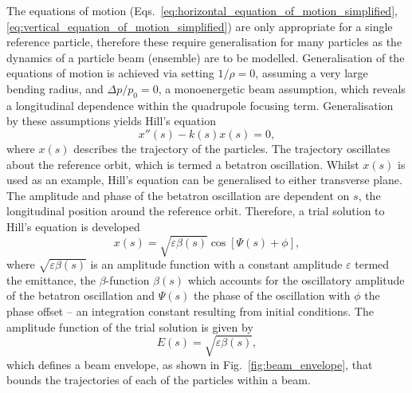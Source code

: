 \documentclass[../main.tex]{subfiles}
\begin{document}
The equations of motion (Eqs.~\ref{eq:horizontal_equation_of_motion_simplified}, \ref{eq:vertical_equation_of_motion_simplified}) are only appropriate for a single reference particle, therefore these require generalisation for many particles as the dynamics of a particle beam (ensemble) are to be modelled. Generalisation of the equations of motion is achieved via setting $1/\rho=0$, assuming a very large bending radius, and $\Delta p/p_{0}=0$, a monoenergetic beam assumption, which reveals a longitudinal dependence within the quadrupole focusing term. Generalisation by these assumptions yields Hill's equation
\begin{equation}
x''\left(s\right)-k\left(s\right)x\left(s\right) = 0,
\label{eq:Hills_equation}    
\end{equation}
where $x\left(s\right)$ describes the trajectory of the particles. The trajectory oscillates about the reference orbit, which is termed a betatron oscillation. Whilst $x\left(s\right)$ is used as an example, Hill's equation can be generalised to either transverse plane. The amplitude and phase of the betatron oscillation are dependent on $s$, the longitudinal position around the reference orbit. Therefore, a trial solution to Hill's equation is developed 
\begin{equation}
x\left(s\right) = \sqrt{\varepsilon\beta\left(s\right)}\cos\left[\Psi\left(s\right)+\phi\right],
\label{eq:Hills_trial_solution}    
\end{equation}
where $\sqrt{\varepsilon\beta\left(s\right)}$ is an amplitude function with a constant amplitude $\varepsilon$ termed the emittance, the $\beta$-function $\beta\left(s\right)$ which accounts for the oscillatory amplitude of the betatron oscillation and $\Psi\left(s\right)$ the phase of the oscillation with $\phi$ the phase offset -- an integration constant resulting from initial conditions. The amplitude function of the trial solution is given by
\begin{equation}
E\left(s\right) = \sqrt{\varepsilon\beta\left(s\right)},
\label{eq:envelope_function}    
\end{equation}
which defines a beam envelope, as shown in Fig.~\ref{fig:beam_envelope}, that bounds the trajectories of each of the particles within a beam. 
\end{document}
